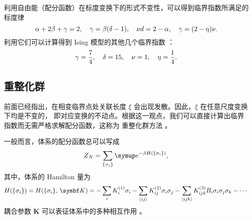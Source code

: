 %
%

利用自由能（配分函数）在标度变换下的形式不变性，可以得到临界指数所满足的标度律
\cite{pathria,linzonghan}
\begin{equation}
  \alpha + 2\beta + \gamma = 2 \qc
  \gamma = \beta (\delta - 1)  \qc
  \nu d = 2 - \alpha           \qc
  \gamma = (2-\eta) \nu.
\end{equation}
利用它们可以计算得到 Ising 模型的其他几个临界指数 \cite{pathria,linzonghan}：
\begin{equation}
  \gamma = \frac{7}{4} \qc
  \delta = 15          \qc
  \nu    = 1           \qc
  \eta   = \frac{1}{4}.
\end{equation}

\subsection{重整化群}

前面已经指出，在相变临界点处关联长度 $\xi$ 会出现发散。因此，$\xi$ 在任意尺度变换下均是不变的，
即对应变换的不动点。根据这一观点，我们可以直接计算出临界指数而无需严格求解配分函数，这称为
重整化群方法 \cite{linzonghan}。

一般而言，体系的配分函数总可以写成
\begin{equation}
  Z_N = \sum_\q{\sigma_i} \ee^{-\beta H(\q{\sigma_i})},
\end{equation}
其中，体系的 Hamilton 量为
\begin{equation}
    H(\q{\sigma_i})
  = H(\q{\sigma_i},\,\bm{K})
  = - \sum_i K^{(1)}_i \sigma_i
    - \sum_{\nearest{ij}} K^{(2)}_{ij} \sigma_i\sigma_j
    - \sum_{\nearest{ijk}} K^{(3)}_{ijk} B_i\sigma_i\sigma_j\sigma_k - \cdots
\end{equation}
耦合参数 $\bm{K}$ 可以表征体系中的多种相互作用 \cite{pathria,surukeng}。


